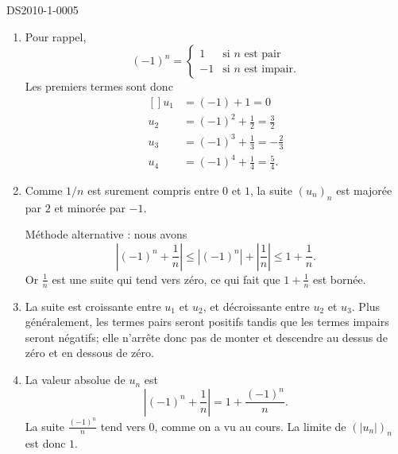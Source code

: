 
\begin{corrige}{DS2010-1-0005}

	\begin{enumerate}
		\item
			Pour rappel, 
			\begin{equation}
				(-1)^n=\begin{cases}
					1	&	\text{si $n$ est pair}\\
					-1	&	 \text{si $n$ est impair.}
				\end{cases}
			\end{equation}
			Les premiers termes sont donc
			\begin{equation}
				\begin{aligned}[]
					u_1&=(-1)+1=0\\
					u_2&=(-1)^2+\frac{ 1 }{2}=\frac{ 3 }{ 2 }\\
					u_3&=(-1)^3+\frac{1}{ 3 }=-\frac{ 2 }{ 3 }\\
					u_4&=(-1)^4+\frac{1}{ 4 }=\frac{ 5 }{ 4 }.
				\end{aligned}
			\end{equation}
		\item
                  Comme $1/n$ est surement compris entre $0$ et $1$, la suite $(u_n)_n$ est majorée par $2$ et minorée par $-1$.

		  Méthode alternative : nous avons
			\begin{equation}
				\left| (-1)^n+\frac{1}{ n } \right| \leq | (-1)^n |+\left| \frac{1}{ n } \right| \leq 1+\frac{1}{ n }.
			\end{equation}
			Or $\frac{1}{ n }$ est une suite qui tend vers zéro, ce qui fait que $1+\frac{1}{ n }$ est bornée.
		\item
			La suite est croissante entre $u_1$ et $u_2$, et décroissante entre $u_2$ et $u_3$. Plus généralement, les termes pairs seront positifs tandis que les termes impairs seront négatifs; elle n'arrête donc pas de monter et descendre au dessus de zéro et en dessous de zéro.
		\item
		   La valeur absolue de $u_n$ est
                  \begin{equation}
				\left| (-1)^n+\frac{1}{ n } \right| =1+ \frac{(-1)^n }{ n }.
			\end{equation}
                  La suite $\frac{(-1)^n }{ n }$ tend vers $0$, comme on a vu au cours. La limite de $(|u_n|)_n$ est donc $1$.


\end{enumerate}
\end{corrige}

